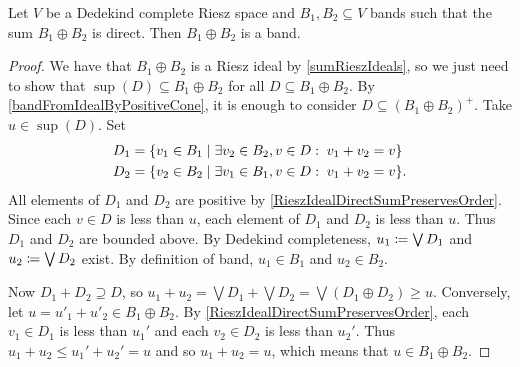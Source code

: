 \begin{proposition} \label{DedekindCompleteDirectSumBands}
Let $V$ be a Dedekind complete Riesz space and $B_1, B_2\subseteq V$ bands such that the sum $B_1\oplus B_2$ is direct. Then $B_1 \oplus B_2$ is a band.
\end{proposition}
\begin{proof}
We have that $B_1\oplus B_2$ is a Riesz ideal by \ref{sumRieszIdeals}, so we just need to show that $\sup(D)\subseteq B_1\oplus B_2$ for all $D\subseteq B_1\oplus B_2$. By \ref{bandFromIdealByPositiveCone}, it is enough to consider $D\subseteq (B_1\oplus B_2)^+$. Take $u\in \sup(D)$. Set
\begin{align*}
D_1 &= \setbuilder{v_1\in B_1}{\exists v_2\in B_2, v\in D: \; v_1 + v_2 = v} \\
D_2 &= \setbuilder{v_2\in B_2}{\exists v_1\in B_1, v\in D: \; v_1 + v_2 = v}.
\end{align*}
All elements of $D_1$ and $D_2$ are positive by \ref{RieszIdealDirectSumPreservesOrder}. Since each $v\in D$ is less than $u$, each element of $D_1$ and $D_2$ is less than $u$. Thus $D_1$ and $D_2$ are bounded above. By Dedekind completeness, $u_1\coloneqq \bigvee D_1$ and $u_2\coloneqq \bigvee D_2$ exist. By definition of band, $u_1\in B_1$ and $u_2\in B_2$.

Now $D_1 + D_2 \supseteq D$, so $u_1 + u_2 = \bigvee D_1 + \bigvee D_2 = \bigvee(D_1\oplus D_2) \geq u$. Conversely, let $u = u'_1 + u'_2\in B_1\oplus B_2$. By \ref{RieszIdealDirectSumPreservesOrder}, each $v_1\in D_1$ is less than $u_1'$ and each $v_2\in D_2$ is less than $u_2'$. Thus $u_1 +u_2 \leq u_1'+u_2' = u$ and so $u_1 + u_2 = u$, which means that $u\in B_1\oplus B_2$.
\end{proof}


